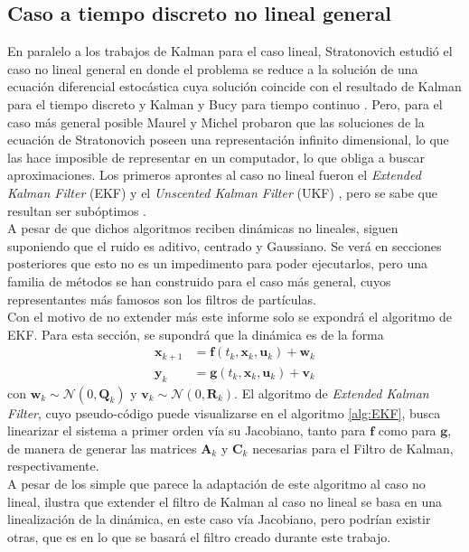 \subsection{Caso a tiempo discreto no lineal general}
En paralelo a los trabajos de Kalman para el caso lineal, Stratonovich estudió el caso no lineal general \cite{Stratonovich1959OptimumNoise, STRATONOVICH1965APPLICATIONBlunn.} en donde el problema se reduce a la solución de una ecuación diferencial estocástica cuya solución coincide con el resultado de Kalman para el tiempo discreto y Kalman y Bucy para tiempo continuo \cite{Kalman1961NewTheory}. Pero, para el caso más general posible Maurel y Michel \cite{Maurel1984DesFinie} probaron que las soluciones de la ecuación de Stratonovich poseen una representación infinito dimensional, lo que las hace imposible de representar en un computador, lo que obliga a buscar aproximaciones.
Los primeros aprontes al caso no lineal fueron el \textit{Extended Kalman Filter} (EKF) \cite{Smith1962ApplicationVehicle, McElhoe1966AnVenus} y el \textit{Unscented Kalman Filter} (UKF) \cite{Julier2004UnscentedEstimation}, pero se sabe que resultan ser subóptimos \cite{Setoodeh2022NonlinearApplications}.\\ 
A pesar de que dichos algoritmos reciben dinámicas no lineales, siguen suponiendo que el ruido es aditivo, centrado y Gaussiano. Se verá en secciones posteriores que esto no es un impedimento para poder ejecutarlos, pero una familia de métodos se han construido para el caso más general, cuyos representantes más famosos son los filtros de partículas.\\
Con el motivo de no extender más este informe solo se expondrá el algoritmo de EKF. Para esta sección, se supondrá que la dinámica es de la forma
\begin{equation}
	\begin{aligned}
		\mathbf{x}_{k+1} &= \mathbf{f}(t_k, \mathbf{x}_k, \mathbf{u}_k) + \mathbf{w}_k \\
		\mathbf{y}_k &= \mathbf{g}(t_k, \mathbf{x}_k, \mathbf{u}_k) + \mathbf{v}_k 
	\end{aligned}
	\label{eq:no_lin_disc_add}
\end{equation} 
con $\mathbf{w}_k \sim \mathcal{N}(0, \mathbf{Q}_k)$ y $\mathbf{v}_k \sim \mathcal{N}(0, \mathbf{R}_k)$. 
El algoritmo de \textit{Extended Kalman Filter}, cuyo pseudo-código puede visualizarse en el algoritmo \ref{alg:EKF}, busca linearizar el sistema a primer orden vía su Jacobiano, tanto para $\mathbf{f}$ como para $\mathbf{g}$, de manera de generar las matrices $\mathbf{A}_k$ y $\mathbf{C}_k$ necesarias para el Filtro de Kalman, respectivamente. \\
A pesar de los simple que parece la adaptación de este algoritmo al caso no lineal, ilustra que extender el filtro de Kalman al caso no lineal se basa en una linealización de la dinámica, en este caso vía Jacobiano, pero podrían existir otras, que es en lo que se basará el filtro creado durante este trabajo.

